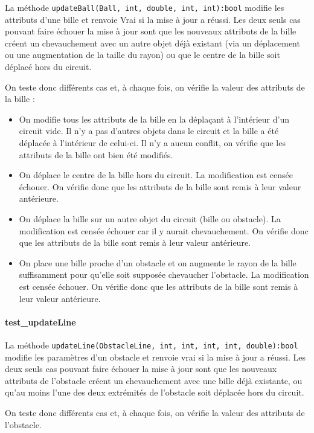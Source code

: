 \documentclass{report}
\begin{document}
La méthode \texttt{updateBall(Ball, int, double, int, int):bool} modifie les attributs d’une bille et renvoie Vrai si la mise à jour a réussi.
Les deux seuls cas pouvant faire échouer la mise à jour sont que les nouveaux attributs de la bille créent un chevauchement avec un autre objet déjà existant (via un déplacement ou une augmentation de la taille du rayon) ou que le centre de la bille soit déplacé hors du circuit.


On teste donc différents cas et, à chaque fois, on vérifie la valeur des attributs de la bille :
\begin{itemize}
\item On modifie tous les attributs de la bille en la déplaçant à l’intérieur d’un circuit vide. Il n’y a pas d’autres objets dans le circuit et la bille a été déplacée à l’intérieur de celui-ci. Il n’y a aucun conflit, on vérifie que les attributs de la bille ont bien été modifiés.
\item On déplace le centre de la bille hors du circuit. La modification est censée échouer. On vérifie donc que les attributs de la bille sont remis à leur valeur antérieure.
\item On déplace la bille sur un autre objet du circuit (bille ou obstacle). La modification est censée échouer car il y aurait chevauchement. On vérifie donc que les attributs de la bille sont remis à leur valeur antérieure.
\item On place une bille proche d’un obstacle et on augmente le rayon de la bille suffisamment pour qu’elle soit supposée chevaucher l’obstacle. La modification est censée échouer. On vérifie donc que les attributs de la bille sont remis à leur valeur antérieure.
\end{itemize}

\paragraph{test\_updateLine}

La méthode \texttt{updateLine(ObstacleLine, int, int, int, int, double):bool} modifie les paramètres d’un obstacle et renvoie vrai si la mise à jour a réussi.
Les deux seuls cas pouvant faire échouer la mise à jour sont que les nouveaux attributs de l’obstacle créent un chevauchement avec une bille déjà existante, ou qu’au moins l’une des deux extrémités de l’obstacle soit déplacée hors du circuit.

On teste donc différents cas et, à chaque fois, on vérifie la valeur des attributs de l’obstacle.
\end{document}
